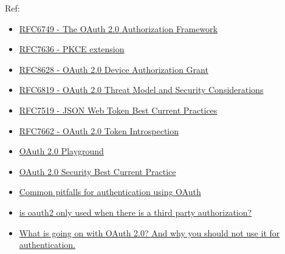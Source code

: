 \documentclass[12pt]{article}
\begin{document}
\begin{Shaded}
\begin{Highlighting}[]
\FunctionTok{\{}
  \FunctionTok{:} \FunctionTok{,}
  \FunctionTok{:} \FunctionTok{,}
  \FunctionTok{:} \FunctionTok{,}
  \FunctionTok{:} \FunctionTok{,}
  \FunctionTok{:} \FunctionTok{,}
  \FunctionTok{:} \FunctionTok{,}
  \FunctionTok{:} \FunctionTok{,}
  \FunctionTok{:} \FunctionTok{,}
  \FunctionTok{:} \FunctionTok{,}
  \FunctionTok{:} 
\FunctionTok{\}}
\end{Highlighting}
\end{Shaded}

Ref:

\begin{itemize}
\tightlist
\item
  \href{https://tools.ietf.org/html/rfc6749}{RFC6749 - The OAuth 2.0 Authorization Framework}
\item
  \href{https://tools.ietf.org/html/rfc7636}{RFC7636 - PKCE extension}
\item
  \href{https://tools.ietf.org/html/rfc8628}{RFC8628 - OAuth 2.0 Device Authorization Grant}
\item
  \href{https://tools.ietf.org/html/rfc6819}{RFC6819 - OAuth 2.0 Threat Model and Security Considerations}
\item
  \href{https://tools.ietf.org/html/draft-ietf-oauth-jwt-bcp-07}{RFC7519 - JSON Web Token Best Current Practices}
\item
  \href{https://tools.ietf.org/html/rfc7662}{RFC7662 - OAuth 2.0 Token Introspection}
\item
  \href{https://www.oauth.com/playground/}{OAuth 2.0 Playground}
\item
  \href{https://tools.ietf.org/html/draft-ietf-oauth-security-topics-15}{OAuth 2.0 Security Best Current Practice}
\item
  \href{https://oauth.net/articles/authentication/\#common-pitfalls}{Common pitfalls for authentication using OAuth}
\item
  \href{https://stackoverflow.com/questions/40956418/is-oauth2-only-used-when-there-is-a-third-party-authorization}{is oauth2 only used when there is a third party authorization?}
\item
  \href{https://medium.com/securing/what-is-going-on-with-oauth-2-0-and-why-you-should-not-use-it-for-authentication-5f47597b2611}{What is going on with OAuth 2.0? And why you should not use it for authentication.}
\end{itemize}
\end{document}
